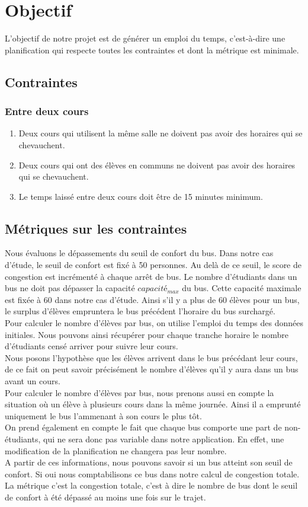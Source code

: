 \documentclass[a4paper,11pt]{article}
\begin{document}
\section{Objectif}
	L'objectif de notre projet est de générer un emploi du temps, c'est-à-dire une planification qui respecte toutes les contraintes et dont la métrique est minimale.
	\subsection{Contraintes}
		\subsubsection{Entre deux cours}
			\begin{enumerate}
				\item Deux cours qui utilisent la même salle ne doivent pas avoir des horaires qui se chevauchent.
				\item Deux cours qui ont des élèves en communs ne doivent pas avoir des horaires qui se chevauchent.
				\item Le temps laissé entre deux cours doit être de 15 minutes minimum.
			\end{enumerate}
	
	\subsection{Métriques sur les contraintes}
		Nous évaluons le dépassements du seuil de confort du bus. Dans notre cas d'étude, le seuil de confort est fixé à 50 personnes. Au delà de ce seuil, le score de congestion est incrémenté à chaque arrêt de bus.
		Le nombre d'étudiants dans un bus ne doit pas dépasser la capacité $capacité_{max}$ du bus. Cette capacité maximale est fixée à 60 dans notre cas d'étude. Ainsi s'il y a plus de 60 élèves pour un bus, le surplus d'élèves empruntera le bus précédent l'horaire du bus surchargé.\\
		Pour calculer le nombre d'élèves par bus, on utilise l'emploi du temps des données initiales. Nous pouvons ainsi récupérer pour chaque tranche horaire le nombre d'étudiants censé arriver pour suivre leur cours.\\
		Nous posons l'hypothèse que les élèves arrivent dans le bus précédant leur cours, de ce fait on peut savoir précisément le nombre d'élèves qu'il y aura dans un bus avant un cours.\\
		Pour calculer le nombre d'élèves par bus, nous prenons aussi en compte la situation où un élève à plusieurs cours dans la même journée. Ainsi il a emprunté uniquement le bus l'ammenant à  son cours le plus tôt.\\
		On prend également en compte le fait que chaque bus comporte une part de non-étudiants, qui ne sera donc pas variable dans notre application. En effet, une modification de la planification ne changera pas leur nombre.\\
		A partir de ces informations, nous pouvons savoir si un bus atteint son seuil de confort. Si oui nous comptabilisons ce bus dans notre calcul de congestion totale. La métrique c'est la congestion totale, c'est à dire le nombre de bus dont le seuil de confort à été dépassé au moins une fois sur le trajet.
		
\end{document}
